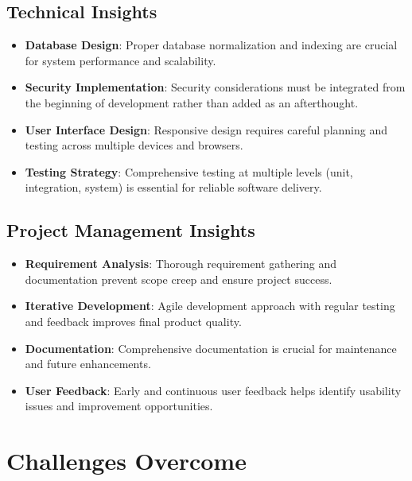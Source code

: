 \subsection{Technical Insights}

\begin{itemize}
    \item \textbf{Database Design}: Proper database normalization and indexing are crucial for system performance and scalability.
    
    \item \textbf{Security Implementation}: Security considerations must be integrated from the beginning of development rather than added as an afterthought.
    
    \item \textbf{User Interface Design}: Responsive design requires careful planning and testing across multiple devices and browsers.
    
    \item \textbf{Testing Strategy}: Comprehensive testing at multiple levels (unit, integration, system) is essential for reliable software delivery.
\end{itemize}

\subsection{Project Management Insights}

\begin{itemize}
    \item \textbf{Requirement Analysis}: Thorough requirement gathering and documentation prevent scope creep and ensure project success.
    
    \item \textbf{Iterative Development}: Agile development approach with regular testing and feedback improves final product quality.
    
    \item \textbf{Documentation}: Comprehensive documentation is crucial for maintenance and future enhancements.
    
    \item \textbf{User Feedback}: Early and continuous user feedback helps identify usability issues and improvement opportunities.
\end{itemize}

\section{Challenges Overcome}

